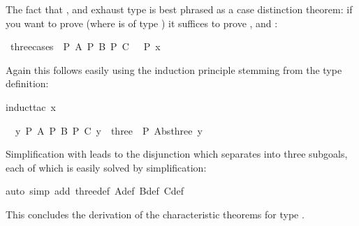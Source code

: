 \begin{isabellebody}
\begin{isamarkuptext}
The fact that ,  and  exhaust type  is
best phrased as a case distinction theorem: if you want to prove 
(where  is of type ) it suffices to prove ,
 and :%
\end{isamarkuptext}%
\isamarkuptrue%
\isamarkupfalse%
\ three{}cases{}\ {}{}\ P\ A{}\ P\ B{}\ P\ C\ {}\ {}\ P\ x{}%
\isadelimproof
%
\endisadelimproof
%
\isatagproof
%
\begin{isamarkuptxt}%
\noindent Again this follows easily using the induction principle stemming from the type definition:%
\end{isamarkuptxt}%
\isamarkuptrue%
\isamarkupfalse%
{}induct{}tac\ x{}%
\begin{isamarkuptxt}%
\begin{isabelle}%
\ {}{}\ {}y{}\ {}P\ A{}\ P\ B{}\ P\ C{}\ y\ {}\ three{}\ {}\ P\ {}Abs{}three\ y{}%
\end{isabelle}
Simplification with  leads to the disjunction  which  separates into three
subgoals, each of which is easily solved by simplification:%
\end{isamarkuptxt}%
\isamarkuptrue%
\isamarkupfalse%
{}auto\ simp\ add{}\ three{}def\ A{}def\ B{}def\ C{}def{}\isanewline
{}\isamarkupfalse%
%
\endisatagproof
{\isafoldproof}%
%
\isadelimproof
%
\endisadelimproof
%
\begin{isamarkuptext}%
\noindent
This concludes the derivation of the characteristic theorems for
type .


\end{isamarkuptext}
\end{isabellebody}
